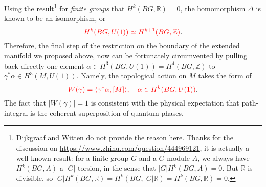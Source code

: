\documentclass[10pt,nofootinbib,letterpaper]{revtex4}
\begin{document}
		Using the result\footnote{Dijkgraaf and Witten do not provide the reason here. Thanks for the discussion on \url{https://www.zhihu.com/question/444969121}, it is actually a well-known result: for a finite group $G$ and a $G$-module $A$, we always have $H^k(BG,A)$ a $|G|$-torsion, in the sense that $|G|H^k(BG,A)=0$. But $\mathbb{R}$ is divisible, so $|G|H^k(BG,\mathbb{R})=H^k(BG,|G|\mathbb{R})=H^k(BG,\mathbb{R})=0$.} for \emph{finite groups} that $H^k(BG,\mathbb{R})=0$, the homomorphism $\bar\Delta$ is known to be an isomorphism, or
		\begin{equation}\label{A.3.4}
			{\color{red}H^k(BG,U(1))\simeq H^{k+1}(BG,\mathbb{Z})}.
		\end{equation}
		\indent Therefore, the final step of the restriction on the boundary of the extended manifold we proposed above, now can be fortunately circumvented by pulling back directly one element $\alpha\in H^3(BG,U(1))=H^4(BG,\mathbb{Z})$ to $\gamma^*\alpha\in H^3(M,U(1))$. Namely, the topological action on $M$ takes the form of
		\begin{equation}\label{A.3.3}
			{\color{red}W(\gamma)=\langle\gamma^*\alpha,[M]\rangle,\quad \alpha\in H^k(BG,U(1))}.
		\end{equation}
		The fact that $|W(\gamma)|=1$ is consistent with the physical expectation that path-integral is the coherent superposition of quantum phases.
\end{document}

